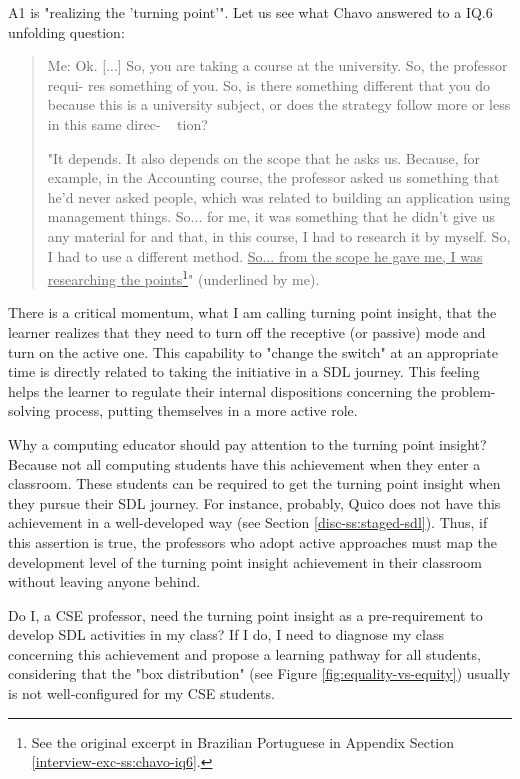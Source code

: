 \gls{A}1 is "realizing the 'turning point'". Let us see what Chavo answered to a \acrfull{IQ}.6 unfolding question:
\begin{quote}
    \colorbox{black!15}{Me: Ok. [...] So, you are taking a course at the university. So, the professor requi-}
    \colorbox{black!15}{res something of you. So, is there something different that you do because this is} \colorbox{black!15}{a university subject, or does the strategy follow more or less in this same direc-} \mbox{   } \colorbox{black!15}{tion?}
    
    "It depends. It also depends on the scope that he asks us. Because, for example, in the Accounting course, the professor asked us something that he'd never asked people, which was related to building an application using management things. So... for me, it was something that he didn't give us any material for and that, in this course, I had to research it by myself. So, I had to use a different method. \underline{So... from the scope he gave me, I was researching the points}\footnote{See the original excerpt in Brazilian Portuguese in Appendix Section \ref{interview-exc-ss:chavo-iq6}.}" (underlined by me).
\end{quote}

There is a critical momentum, what I am calling turning point insight, that the learner realizes that they need to turn off the receptive (or passive) mode and turn on the active one. This capability to "change the switch" at an appropriate time is directly related to taking the initiative in a \gls{SDL} journey. This feeling helps the learner to regulate their internal dispositions concerning the problem-solving process, putting themselves in a more active role.

Why a computing educator should pay attention to the turning point insight? Because not all computing students have this achievement when they enter a classroom. These students can be required to get the turning point insight when they pursue their \gls{SDL} journey. For instance, probably, Quico does not have this achievement in a well-developed way (see Section \ref{disc-ss:staged-sdl}). Thus, if this assertion is true, the professors who adopt active approaches must map the development level of the turning point insight achievement in their classroom without leaving anyone behind.

Do I, a \gls{CSE} professor, need the turning point insight as a pre-requirement to develop \gls{SDL} activities in my class? If I do, I need to diagnose my class concerning this achievement and propose a learning pathway for all students, considering that the "box distribution" (see Figure \ref{fig:equality-vs-equity}) usually is not well-configured for my \gls{CSE} students.

